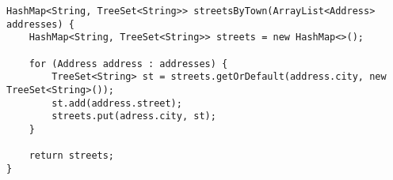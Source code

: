 \begin{lstlisting}
HashMap<String, TreeSet<String>> streetsByTown(ArrayList<Address> addresses) {
    HashMap<String, TreeSet<String>> streets = new HashMap<>();

    for (Address address : addresses) {
        TreeSet<String> st = streets.getOrDefault(address.city, new TreeSet<String>());
        st.add(address.street);
        streets.put(adress.city, st);
    }

    return streets;
}
\end{lstlisting}
